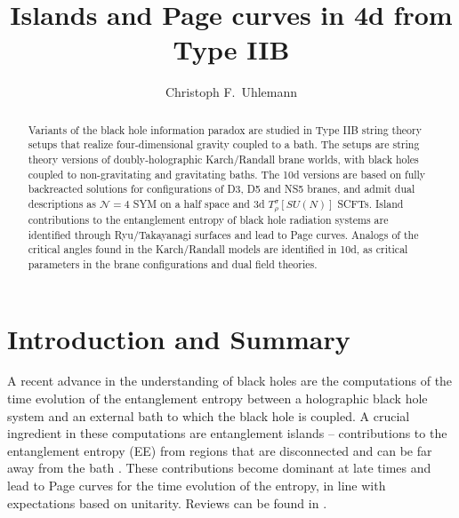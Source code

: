 \documentclass[aps,prd,11pt,notitlepage,longbibliography,nofootinbib,tightenlines,preprintnumbers]{revtex4-1}
\begin{document}
\title{Islands and Page curves in 4d from Type IIB}

\author{Christoph F.~Uhlemann} 



\begin{abstract}
Variants of the black hole information paradox are studied in Type IIB string theory setups that realize four-dimensional gravity coupled to a bath. The setups are string theory versions of doubly-holographic Karch/Randall brane worlds, with black holes coupled to non-gravitating and gravitating baths. The 10d versions are based on fully backreacted solutions for configurations of D3, D5 and NS5 branes, and admit dual descriptions as $\mathcal N=4$ SYM on a half space and 3d $T_\rho^\sigma[SU(N)]$ SCFTs. Island contributions to the entanglement entropy of black hole radiation systems are identified through Ryu/Takayanagi surfaces and lead to Page curves. Analogs of the critical angles found in the Karch/Randall models are identified in 10d, as critical parameters in the brane configurations and dual field theories.
\end{abstract}

\maketitle

\bigskip
\tableofcontents
\bigskip

\setlength{\parskip}{1.6pt}



\section{Introduction and Summary}

A recent advance in the understanding of black holes are the computations \cite{Penington:2019npb,Almheiri:2019psf} of the time evolution of the entanglement entropy between a holographic black hole system and an external bath to which the black hole is coupled.
A crucial ingredient in these computations are entanglement islands -- contributions to the entanglement entropy (EE) from regions that are disconnected and can be far away from the bath \cite{Almheiri:2019hni,Almheiri:2019yqk,Almheiri:2019psy,Almheiri:2019qdq,Penington:2019kki}.
These contributions become dominant at late times and lead to Page curves for the time evolution of the entropy, in line with expectations based on unitarity. Reviews can be found in \cite{Almheiri:2020cfm,Raju:2020smc}.
\end{document}

